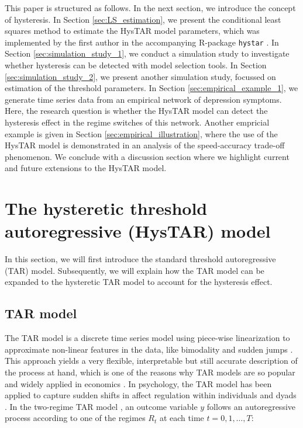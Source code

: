 \documentclass{article}
\begin{document}
This paper is structured as follows.
In the next section, we introduce the concept of hysteresis.
In Section \ref{sec:LS_estimation}, we present the conditional least squares method to estimate the HysTAR model parameters, which was implemented by the first author in the accompanying \textsf{R}-package \texttt{hystar} \citep{R, R_hystar}.
In Section \ref{sec:simulation_study_1}, we conduct a simulation study to investigate whether hysteresis can be detected with model selection tools.
In Section \ref{sec:simulation_study_2}, we present another simulation study, focussed on estimation of the threshold parameters.
In Section \ref{sec:empirical_example_1}, we generate time series data from an empirical network of depression symptoms. Here, the research question is whether the HysTAR model can detect the hysteresis effect in the regime switches of this network.
Another empricial example is given in Section \ref{sec:empirical_illustration}, where the use of the HysTAR model is demonstrated in an analysis of the speed-accuracy trade-off phenomenon.
We conclude with a discussion section where we highlight current and future extensions to the HysTAR model.

\section{The hysteretic threshold autoregressive (HysTAR) model} \label{sec:hystar}
In this section, we will first introduce the standard threshold autoregressive (TAR) model.
Subsequently, we will explain how the TAR model can be expanded to the hysteretic TAR model to account for the hysteresis effect.

\subsection{TAR model}
The TAR model is a discrete time series model using piece-wise linearization to approximate non-linear features in the data, like bimodality and sudden jumps \citep{tar}.
This approach yields a very flexible, interpretable but still accurate description of the process at hand, which is one of the reasons why TAR models are so popular and widely applied in economics \citep{tar_in_economics}.
In psychology, the TAR model has been applied to capture sudden shifts in affect regulation within individuals \citep{tar_affect_person1, tar_affect_person2} and dyads \citep{tar_affect_dyadic1, tar_affect_dyadic2}.
In the two-regime TAR model \citet{tar}, an outcome variable $y$ follows an autoregressive process according to one of the regimes $R_t$ at each time $t = 0, 1, \dots, T$:
\end{document}
